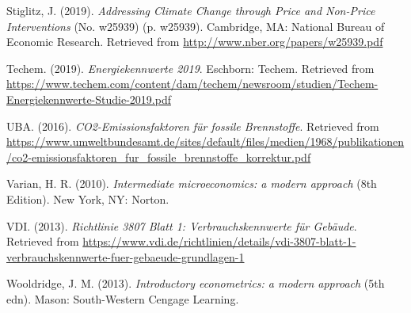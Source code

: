 \documentclass[12pt,twoside]{reedthesis}
\newlength{\cslhangindent}
\newenvironment{CSLReferences}[2] %
 {%
  \setlength{\parindent}{0pt}
  \ifodd #1 \everypar{\setlength{\hangindent}{\cslhangindent}}\ignorespaces\fi
  \ifnum #2 > 0
  \setlength{\parskip}{#2\baselineskip}
  \fi
 }%
 {}
\begin{document}
\begin{CSLReferences}{1}{0}
\leavevmode{}%
Stiglitz, J. (2019). \emph{Addressing Climate Change through Price and Non-Price Interventions} (No. w25939) (p. w25939). Cambridge, MA: National Bureau of Economic Research. Retrieved from \url{http://www.nber.org/papers/w25939.pdf}

\leavevmode{}%
Techem. (2019). \emph{Energiekennwerte 2019}. Eschborn: Techem. Retrieved from \url{https://www.techem.com/content/dam/techem/newsroom/studien/Techem-Energiekennwerte-Studie-2019.pdf}

\leavevmode{}%
UBA. (2016). \emph{CO2-Emissionsfaktoren für fossile Brennstoffe}. Retrieved from \url{https://www.umweltbundesamt.de/sites/default/files/medien/1968/publikationen/co2-emissionsfaktoren_fur_fossile_brennstoffe_korrektur.pdf}

\leavevmode{}%
Varian, H. R. (2010). \emph{Intermediate microeconomics: a modern approach} (8th Edition). New York, NY: Norton.

\leavevmode{}%
VDI. (2013). \emph{Richtlinie 3807 Blatt 1: Verbrauchskennwerte für Gebäude}. Retrieved from \url{https://www.vdi.de/richtlinien/details/vdi-3807-blatt-1-verbrauchskennwerte-fuer-gebaeude-grundlagen-1}

\leavevmode{}%
Wooldridge, J. M. (2013). \emph{Introductory econometrics: a modern approach} (5th edn). Mason: South-Western Cengage Learning.

\end{CSLReferences}

\end{document}
